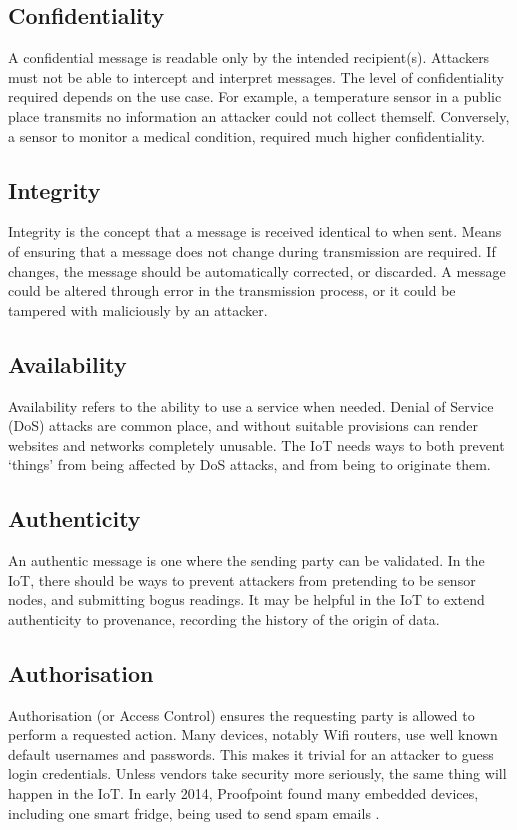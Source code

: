 \documentclass[10pt,journal,compsoc]{IEEEtran}
\begin{document}
\subsection{Confidentiality}
A confidential message is readable only by the intended recipient(s).
Attackers must not be able to intercept and interpret messages. The level of
confidentiality required depends on the use case. For example, a temperature
sensor in a public place transmits no information an attacker could not collect
themself. Conversely, a sensor to monitor a medical condition, required much
higher confidentiality. 

\subsection{Integrity}
Integrity is the concept that a message is received identical to when sent.
Means of ensuring that a message does not change during transmission are
required. If changes, the message should be automatically corrected, or
discarded. A message could be altered through error in the transmission
process, or it could be tampered with maliciously by an attacker. 

\subsection{Availability}
Availability refers to the ability to use a service when needed.  Denial of
Service (DoS) attacks are common place, and without suitable provisions can
render websites and networks completely unusable. The IoT needs ways to both
prevent `things' from being affected by DoS attacks, and from being to
originate them.

\subsection{Authenticity}
An authentic message is one where the sending party can be validated. In the
IoT, there should be ways to prevent attackers from pretending to be sensor
nodes, and submitting bogus readings. It may be helpful in the IoT to extend
authenticity to provenance, recording the history of the origin of data.

\subsection{Authorisation}
Authorisation (or Access Control) ensures the requesting party is allowed to
perform a requested action. Many devices, notably Wifi routers, use well known
default usernames and passwords. This makes it trivial for an attacker to guess
login credentials. Unless vendors take security more seriously, the same thing
will happen in the IoT. In early 2014, Proofpoint found many embedded devices,
including one smart fridge, being used to send spam emails
\cite{Proofpoint2014}. 
\end{document}
